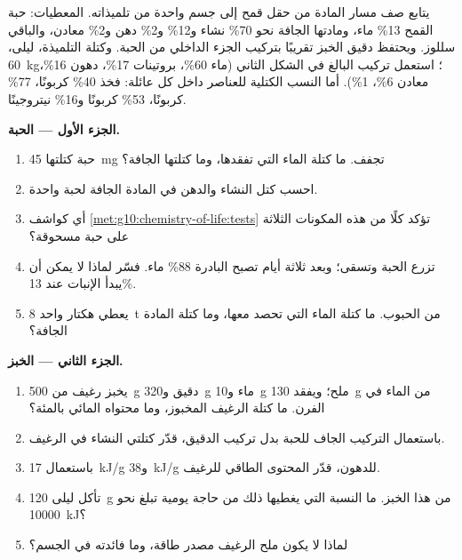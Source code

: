 \begin{problem}
\label{pb:g10:chemistry-of-life:1}
يتابع صف مسار المادة من حقل قمح إلى جسم واحدة من تلميذاته. المعطيات:
حبة القمح 13\% ماء، ومادتها الجافة نحو 70\% نشاء و12\%  و2\%
دهن و2\% معادن، والباقي سللوز. ويحتفظ دقيق الخبز تقريبًا بتركيب الجزء
الداخلي من الحبة. وكتلة التلميذة، ليلى، \qty{60}{kg}؛ استعمل تركيب
البالغ في الشكل الثاني (ماء 60\%، بروتينات 17\%، دهون 16\%، معادن
6\%،  1\%). أما النسب الكتلية للعناصر داخل كل عائلة: فخذ
 40\% كربونًا،  77\% كربونًا،  53\%
كربونًا و16\% نيتروجينًا.

\medskip
\noindent\textbf{الجزء الأول --- الحبة.}
\begin{enumerate}
  \item حبة كتلتها \qty{45}{mg} تجفف. ما كتلة الماء التي تفقدها، وما
        كتلتها الجافة؟
  \item احسب كتل النشاء  والدهن في المادة الجافة لحبة واحدة.
  \item أي كواشف \cref{met:g10:chemistry-of-life:tests} تؤكد كلًا من
        هذه المكونات الثلاثة على حبة مسحوقة؟
  \item تزرع الحبة وتسقى؛ وبعد ثلاثة أيام تصبح البادرة 88\% ماء. فسّر
        لماذا لا يمكن أن يبدأ الإنبات عند 13\%.
  \item يعطي هكتار واحد \qty{8}{t} من الحبوب. ما كتلة الماء التي تحصد
        معها، وما كتلة المادة الجافة؟
\end{enumerate}

\medskip
\noindent\textbf{الجزء الثاني --- الخبز.}
\begin{enumerate}[resume]
  \item يخبز رغيف من \qty{500}{g} دقيق و\qty{320}{g} ماء و\qty{10}{g}
        ملح؛ ويفقد \qty{130}{g} من الماء في الفرن. ما كتلة الرغيف
        المخبوز، وما محتواه المائي بالمئة؟
  \item باستعمال التركيب الجاف للحبة بدل تركيب الدقيق، قدّر كتلتي
        النشاء  في الرغيف.
  \item باستعمال \qty{17}{kJ/g}  
        و\qty{38}{kJ/g} للدهون، قدّر المحتوى الطاقي للرغيف.
  \item تأكل ليلى \qty{120}{g} من هذا الخبز. ما النسبة التي يغطيها
        ذلك من حاجة يومية تبلغ نحو \qty{10000}{kJ}؟
  \item لماذا لا يكون ملح الرغيف مصدر طاقة، وما فائدته في الجسم؟
\end{enumerate}


\end{problem}
